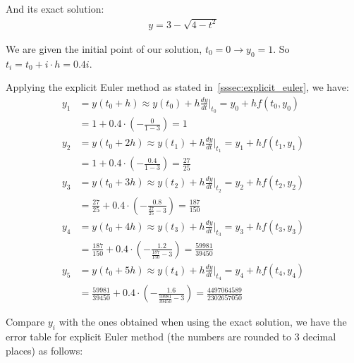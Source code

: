 \documentclass[a4paper]{article}
\begin{document}
And its exact solution:
\begin{align*}
  y = 3 - \sqrt{4-t^2}
\end{align*}

We are given the initial point of our solution, \(t_0 = 0 \rightarrow y_0 = 1\). So \(t_i = t_0 + i \cdot h = 0.4i\).

Applying the explicit Euler method as stated in~\ref{sssec:explicit_euler}, we have:
\begin{align*}
  y_1 & = y(t_0 + h) \approx y(t_0) + h\frac{dy}{dt}\biggr|_{t_0} = y_0 + hf(t_0, y_0)                                      \\
      & = 1 + 0.4 \cdot \left(-\frac{0}{1-3}\right) = 1                                                                     \\
  y_2 & = y(t_0 + 2h) \approx y(t_1) + h\frac{dy}{dt}\biggr|_{t_1} = y_1 + hf(t_1, y_1)                                     \\
      & = 1 + 0.4 \cdot \left(-\frac{0.4}{1-3}\right) = \frac{27}{25}                                                       \\
  y_3 & = y(t_0 + 3h) \approx y(t_2) + h\frac{dy}{dt}\biggr|_{t_2} = y_2 + hf(t_2, y_2)                                     \\
      & = \frac{27}{25} + 0.4 \cdot \left(-\frac{0.8}{\frac{27}{25} - 3}\right) = \frac{187}{150}                           \\
  y_4 & = y(t_0 + 4h) \approx y(t_3) + h\frac{dy}{dt}\biggr|_{t_3} = y_3 + hf(t_3, y_3)                                     \\
      & = \frac{187}{150} + 0.4 \cdot \left(-\frac{1.2}{\frac{187}{150} - 3}\right) = \frac{59981}{39450}                   \\
  y_5 & = y(t_0 + 5h) \approx y(t_4) + h\frac{dy}{dt}\biggr|_{t_4} = y_4 + hf(t_4, y_4)                                     \\
      & = \frac{59981}{39450} + 0.4 \cdot \left(-\frac{1.6}{\frac{59981}{39450} - 3}\right) = \frac{4497064589}{2302657050}
\end{align*}

Compare \(y_i\) with the ones obtained when using the exact solution, we have the error table for explicit Euler method (the numbers are rounded to 3 decimal places) as follows:
\end{document}

